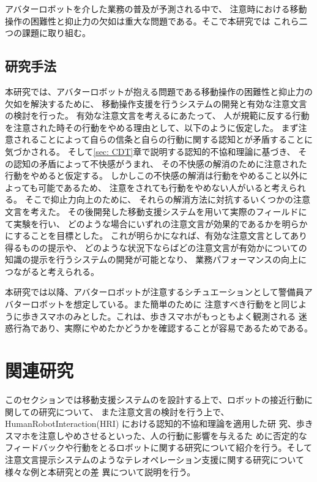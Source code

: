 \documentclass{kuisthesis}
\begin{document}
アバターロボットを介した業務の普及が予測される中で、
注意時における移動操作の困難性と抑止力の欠如は重大な問題である。そこで本研究では
これら二つの課題に取り組む。


\subsection{研究手法}
\label{sec: 研究目的}
本研究では、アバターロボットが抱える問題である移動操作の困難性と抑止力の欠如を解決するために、
移動操作支援を行うシステムの開発と有効な注意文言の検討を行った。
有効な注意文言を考えるにあたって、
人が規範に反する行動を注意された時その行動をやめる理由として、以下のように仮定した。
まず注意されることによって自らの信条と自らの行動に関する認知とが矛盾することに気づかされる。
そして\ref{sec: CDT}章で説明する認知的不協和理論\cite{Festinger1957}に基づき、
その認知の矛盾によって不快感がうまれ、
その不快感の解消のために注意された行動をやめると仮定する。
しかしこの不快感の解消は行動をやめること以外によっても可能であるため、
注意をされても行動をやめない人がいると考えられる。
そこで抑止力向上のために、
それらの解消方法に対抗するいくつかの注意文言を考えた。
その後開発した移動支援システムを用いて実際のフィールドにて実験を行い、
どのような場合にいずれの注意文言が効果的であるかを明らかにすることを目標とした。
これが明らかになれば、有効な注意文言としてあり得るものの提示や、
どのような状況下ならばどの注意文言が有効かについての知識の提示を行うシステムの開発が可能となり、
業務パフォーマンスの向上につながると考えられる。


本研究では以降、アバターロボットが注意するシチュエーションとして警備員アバターロボットを想定している。また簡単のために
注意すべき行動を\cite{Schneider2022,Mizumaru2019}と同じように歩きスマホのみとした。これは、歩きスマホがもっともよく観測される
迷惑行為であり、実際にやめたかどうかを確認することが容易であるためである。



\section{関連研究}
このセクションでは移動支援システムのを設計する上で、ロボットの接近行動に関しての研究について、
また注意文言の検討を行う上で、
HumanRobotInteraction(HRI) における認知的不協和理論を適用した研
究、歩きスマホを注意しやめさせるといった、人の行動に影響を与えるた
めに否定的なフィードバックや行動をとるロボットに関する研究について紹介を行う。そして
注意文言提示システムのようなテレオペレーション支援に関する研究について様々な例と本研究との差
異について説明を行う。
\end{document}
